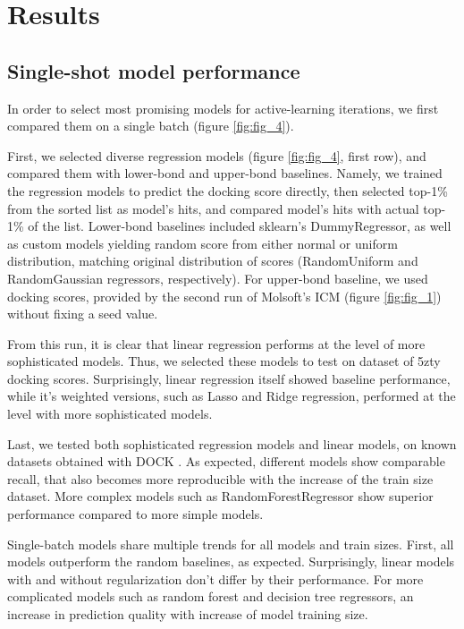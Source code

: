 \section{Results}

\subsection{Single-shot model performance}

In order to select most promising models for active-learning iterations, we first compared them on a single batch (figure \ref{fig:fig_4}). 

First, we selected diverse regression models (figure \ref{fig:fig_4}, first row), and compared them with lower-bond and upper-bond baselines. Namely, we trained the regression models to predict the docking score directly, then selected top-1\% from the sorted list as model's hits, and compared model's hits with actual top-1\% of the list. Lower-bond baselines included sklearn's DummyRegressor, as well as custom models yielding random score from either normal or uniform distribution, matching original distribution of scores (RandomUniform and RandomGaussian regressors, respectively). For upper-bond baseline, we used docking scores, provided by the second run of Molsoft's ICM (figure \ref{fig:fig_1}) without fixing a seed value.

From this run, it is clear that linear regression performs at the level of more sophisticated models. Thus, we selected these models to test on dataset of 5zty docking scores. Surprisingly, linear regression itself showed baseline performance, while it's weighted versions, such as Lasso and Ridge regression, performed at the level with more sophisticated models.

Last, we tested both sophisticated regression models and linear models, on known datasets obtained with DOCK \cite{ultralarge_docking_first}. As expected, different models show comparable recall, that also becomes more reproducible with the increase of the train size dataset. More complex models such as RandomForestRegressor show superior performance compared to more simple models. 

Single-batch models share multiple trends for all models and train sizes. First, all models outperform the random baselines, as expected. Surprisingly, linear models with and without regularization don't differ by their performance. For more complicated models such as random forest and decision tree regressors, an increase in prediction quality with increase of model training size. 

